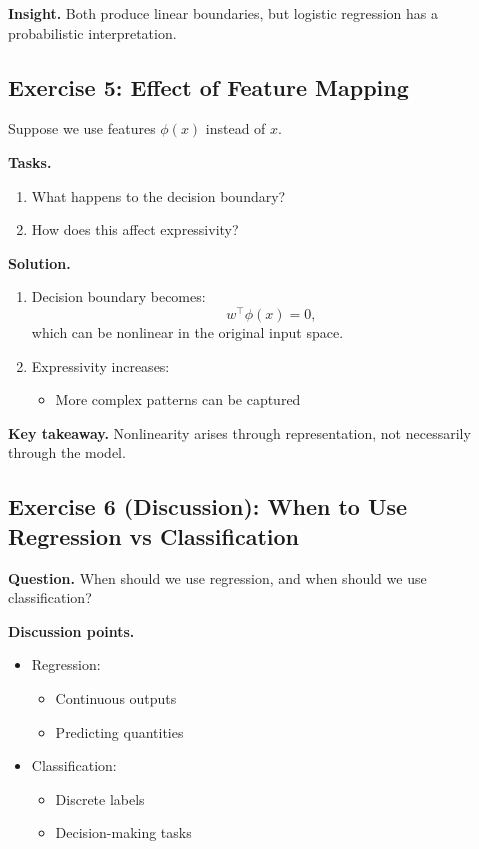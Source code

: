 \medskip

\noindent
\textbf{Insight.}  
Both produce linear boundaries, but logistic regression has a probabilistic interpretation.

\subsection{Exercise 5: Effect of Feature Mapping}

Suppose we use features $\phi(x)$ instead of $x$.

\medskip

\noindent
\textbf{Tasks.}
\begin{enumerate}
    \item What happens to the decision boundary?
    \item How does this affect expressivity?
\end{enumerate}

\medskip

\noindent
\textbf{Solution.}

\begin{enumerate}
\item Decision boundary becomes:
\[
w^\top \phi(x) = 0,
\]
which can be nonlinear in the original input space.

\item Expressivity increases:
\begin{itemize}
    \item More complex patterns can be captured
\end{itemize}
\end{enumerate}

\medskip

\noindent
\textbf{Key takeaway.}  
Nonlinearity arises through representation, not necessarily through the model.

\subsection{Exercise 6 (Discussion): When to Use Regression vs Classification}

\textbf{Question.}  
When should we use regression, and when should we use classification?

\medskip

\noindent
\textbf{Discussion points.}

\begin{itemize}
    \item Regression:
    \begin{itemize}
        \item Continuous outputs
        \item Predicting quantities
    \end{itemize}

    \item Classification:
    \begin{itemize}
        \item Discrete labels
        \item Decision-making tasks
    \end{itemize}
\end{itemize}

